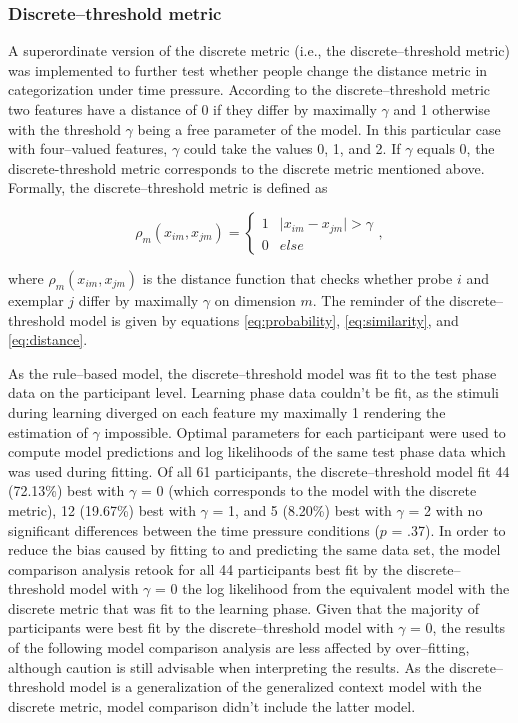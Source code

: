 \documentclass[a4paper,man,natbib]{apa6}
\begin{document}
\subsubsection{Discrete--threshold metric}
A superordinate version of the discrete metric (i.e., the discrete--threshold metric) was implemented to further test whether people change the distance metric in categorization under time pressure. According to the discrete--threshold metric two features have a distance of 0 if they differ by maximally $\gamma$ and 1 otherwise with the threshold $\gamma$ being a free parameter of the model. In this particular case with four--valued features, $\gamma$ could take the values 0, 1, and 2. If $\gamma$ equals 0, the discrete-threshold metric corresponds to the discrete metric mentioned above. Formally, the discrete--threshold metric is defined as

\begin{equation}
\rho_{m}(x_{im}, x_{jm}) = 
\begin{cases}
	1 & \mid x_{im} - x_{jm} \mid > \gamma \\
	0 & else 
\end{cases},
\end{equation}

where $\rho_{m}(x_{im}, x_{jm})$ is the distance function that checks whether probe $i$ and exemplar $j$ differ by maximally $\gamma$ on dimension $m$. The reminder of the discrete--threshold model is given by equations \ref{eq:probability}, \ref{eq:similarity}, and \ref{eq:distance}. 

As the rule--based model, the discrete--threshold model was fit to the test phase data on the participant level. Learning phase data couldn't be fit, as the stimuli during learning diverged on each feature my maximally 1 rendering the estimation of $\gamma$ impossible. Optimal parameters for each participant were used to compute model predictions and log likelihoods of the same test phase data which was used during fitting. Of all 61 participants, the discrete--threshold model fit 44 (72.13\%) best with $\gamma$ = 0 (which corresponds to the model with the discrete metric), 12 (19.67\%) best with $\gamma$ = 1, and 5 (8.20\%) best with $\gamma$ = 2 with no significant differences between the time pressure conditions ($p$ = .37). In order to reduce the bias caused by fitting to and predicting the same data set, the model comparison analysis retook for all 44 participants best fit by the discrete--threshold model with $\gamma$ = 0 the log likelihood from the equivalent model with the discrete metric that was fit to the learning phase. Given that the majority of participants were best fit by the discrete--threshold model with $\gamma$ = 0, the results of the following model comparison analysis are less affected by over--fitting, although caution is still advisable when interpreting the results. As the discrete--threshold model is a generalization of the generalized context model with the discrete metric, model comparison didn't include the latter model. 
\end{document}
